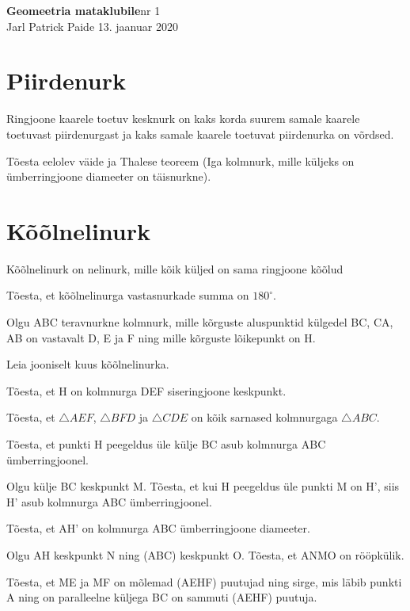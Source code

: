 \documentclass[a4paper,11pt,twocolumn]{article}
\begin{document}
{\huge \textbf{Geomeetria mataklubile}\hfill \normalsize {nr 1}} \\
{Jarl Patrick Paide \hfill 13. jaanuar 2020}

\section{Piirdenurk}

Ringjoone kaarele toetuv kesknurk on kaks korda suurem samale kaarele toetuvast piirdenurgast ja kaks samale kaarele toetuvat piirdenurka on võrdsed.

\begin{question}
	Tõesta eelolev väide ja Thalese teoreem (Iga kolmnurk, mille küljeks on ümberringjoone diameeter on täisnurkne).
\end{question}

\section{Kõõlnelinurk}

Kõõlnelinurk on nelinurk, mille kõik küljed on sama ringjoone kõõlud

\begin{question}
	Tõesta, et kõõlnelinurga vastasnurkade summa on $180^{\circ}$.
\end{question}

\begin{question}
	Olgu ABC teravnurkne kolmnurk, mille kõrguste aluspunktid külgedel BC, CA, AB on vastavalt D, E ja F ning mille kõrguste lõikepunkt on H.
	\begin{subquestion}
		\item Leia jooniselt kuus kõõlnelinurka.
		\item Tõesta, et H on kolmnurga DEF siseringjoone keskpunkt.
		\item Tõesta, et $\triangle AEF$, $\triangle BFD$ ja $\triangle CDE$ on kõik sarnased kolmnurgaga $\triangle ABC$.
		\item Tõesta, et punkti H peegeldus üle külje BC asub kolmnurga ABC ümberringjoonel.
		\item Olgu külje BC keskpunkt M. Tõesta, et kui H peegeldus üle punkti M on H’, siis H’ asub kolmnurga ABC ümberringjoonel.
		\item Tõesta, et AH’ on kolmnurga ABC ümberringjoone diameeter.
		\item Olgu AH keskpunkt N ning (ABC) keskpunkt O. Tõesta, et ANMO on rööpkülik.
		\item Tõesta, et ME ja MF on mõlemad (AEHF) puutujad ning sirge, mis läbib punkti A ning on paralleelne küljega BC on sammuti (AEHF) puutuja.
	\end{subquestion}
\end{question}	
\end{document}
